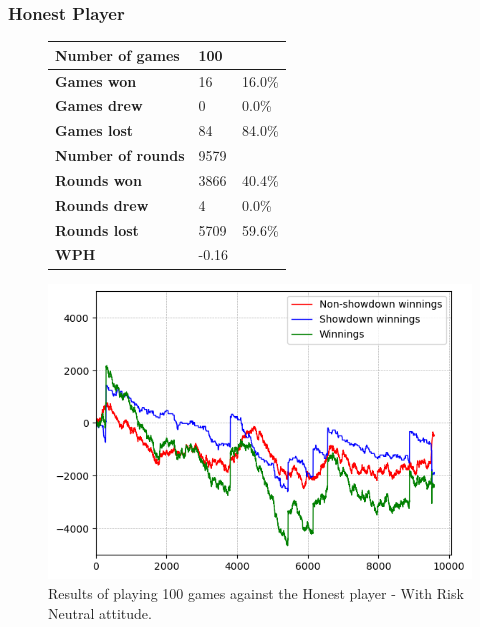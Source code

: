 \subsubsection{Honest Player}
\begin{figure}[H]
    \centering
    \begin{minipage}{\textwidth}
        \begin{minipage}{0.40\textwidth}
            \begin{tabular}{|l|l|l|}
                \hline
                \textbf{Number of games}  & 100   &        \\ \hline
                \textbf{Games won}        & 16    & 16.0\% \\ \hline
                \textbf{Games drew}       & 0     & 0.0\%  \\ \hline
                \textbf{Games lost}       & 84    & 84.0\% \\ \hline
                \textbf{Number of rounds} & 9579  &        \\ \hline
                \textbf{Rounds won}       & 3866   & 40.4\%  \\ \hline
                \textbf{Rounds drew}      & 4     & 0.0\%  \\ \hline
                \textbf{Rounds lost}      & 5709  & 59.6\% \\ \hline
                \textbf{WPH}              & -0.16 &        \\ \hline
            \end{tabular}
        \end{minipage}
        \hspace{0.05\textwidth}
        \begin{minipage}{0.5\textwidth}
            \includegraphics[width=\textwidth]{graphics/risk-neutral/honest.png}
        \end{minipage}
    \end{minipage}
    \caption{Results of playing 100 games against the Honest player - With Risk Neutral attitude.}
    \label{fig:results_neutral_honest}
\end{figure}

